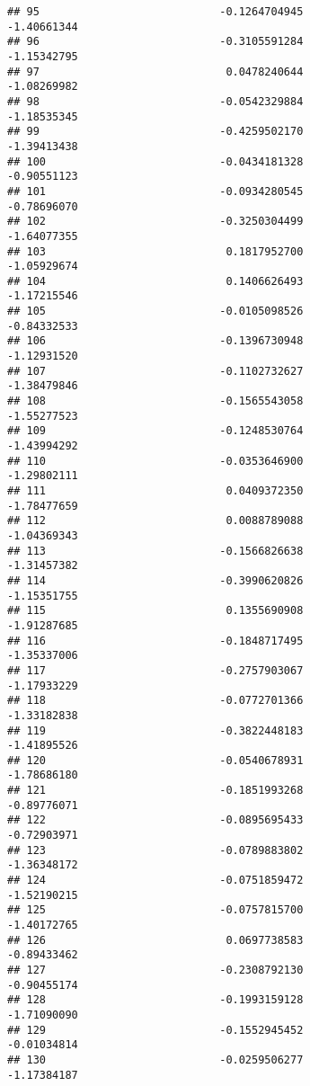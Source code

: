 \documentclass[
]{article}
\begin{document}
\begin{verbatim}
## 95                            -0.1264704945                -1.40661344
## 96                            -0.3105591284                -1.15342795
## 97                             0.0478240644                -1.08269982
## 98                            -0.0542329884                -1.18535345
## 99                            -0.4259502170                -1.39413438
## 100                           -0.0434181328                -0.90551123
## 101                           -0.0934280545                -0.78696070
## 102                           -0.3250304499                -1.64077355
## 103                            0.1817952700                -1.05929674
## 104                            0.1406626493                -1.17215546
## 105                           -0.0105098526                -0.84332533
## 106                           -0.1396730948                -1.12931520
## 107                           -0.1102732627                -1.38479846
## 108                           -0.1565543058                -1.55277523
## 109                           -0.1248530764                -1.43994292
## 110                           -0.0353646900                -1.29802111
## 111                            0.0409372350                -1.78477659
## 112                            0.0088789088                -1.04369343
## 113                           -0.1566826638                -1.31457382
## 114                           -0.3990620826                -1.15351755
## 115                            0.1355690908                -1.91287685
## 116                           -0.1848717495                -1.35337006
## 117                           -0.2757903067                -1.17933229
## 118                           -0.0772701366                -1.33182838
## 119                           -0.3822448183                -1.41895526
## 120                           -0.0540678931                -1.78686180
## 121                           -0.1851993268                -0.89776071
## 122                           -0.0895695433                -0.72903971
## 123                           -0.0789883802                -1.36348172
## 124                           -0.0751859472                -1.52190215
## 125                           -0.0757815700                -1.40172765
## 126                            0.0697738583                -0.89433462
## 127                           -0.2308792130                -0.90455174
## 128                           -0.1993159128                -1.71090090
## 129                           -0.1552945452                -0.01034814
## 130                           -0.0259506277                -1.17384187

\end{verbatim}
\end{document}
